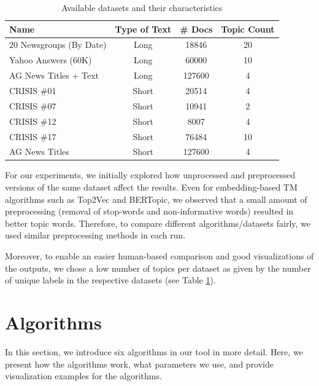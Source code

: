 \documentclass[11pt]{article}
\begin{document}
\begin{table}[ht]
\centering
\begin{adjustbox}{width=0.5\textwidth}
\begin{tabular}{lccc}
\hline
\textbf{Name} & \textbf{Type of Text} & \textbf{\# Docs} & \textbf{Topic Count} \\
\hline
20 Newsgroups (By Date) & Long & 18846 & 20\\ 
Yahoo Answers (60K) & Long & 60000 & 10\\
AG News Titles + Text & Long & 127600 & 4\\
CRISIS \#01 & Short & 20514 & 4\\
CRISIS \#07 & Short & 10941 & 2\\
CRISIS \#12 & Short & 8007 & 4\\
CRISIS \#17 & Short & 76484 & 10\\
AG News Titles & Short & 127600 & 4\\
\hline
\end{tabular}
\end{adjustbox}
\caption{ Available datasets and their characteristics}
\label{tab:datasets}
\end{table}

For our experiments, we initially explored how unprocessed and preprocessed versions of the same dataset affect the results. Even for embedding-based TM algorithms such as Top2Vec and BERTopic, we observed that a small amount of preprocessing (removal of stop-words and non-informative words) resulted in better topic words. Therefore, to compare different algorithms/datasets fairly, we used similar preprocessing methods in each run. 

Moreover, to enable an easier human-based comparison and good visualizations of the outputs, we chose a low number of topics per dataset as given by the number of unique labels in the respective datasets (see Table \ref{tab:datasets}).

\section{Algorithms}
\label{sec:algorithms}

In this section, we introduce six algorithms in our tool in more detail. Here, we present how the algorithms work, what parameters we use, and provide visualization examples for the algorithms.
\end{document}
